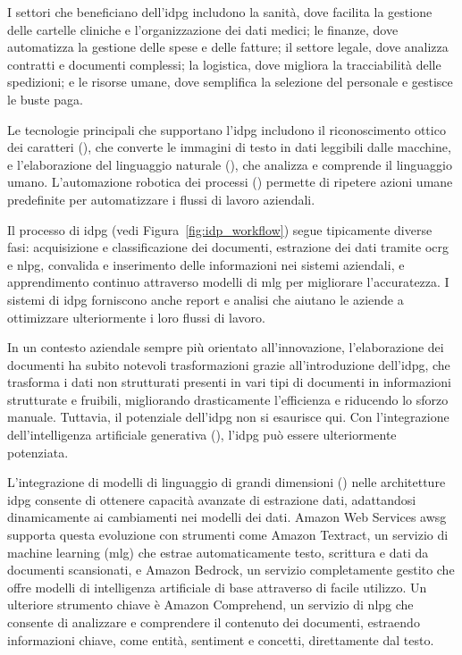 I settori che beneficiano dell'\gls{idpg} includono la sanità, dove facilita la gestione delle cartelle cliniche e l'organizzazione dei dati medici; le finanze, dove automatizza la gestione delle spese e delle fatture; il settore legale, dove analizza contratti e documenti complessi; la logistica, dove migliora la tracciabilità delle spedizioni; e le risorse umane, dove semplifica la selezione del personale e gestisce le buste paga.

Le tecnologie principali che supportano l'\gls{idpg} includono il riconoscimento ottico dei caratteri (), che converte le immagini di testo in dati leggibili dalle macchine, e l'elaborazione del linguaggio naturale (), che analizza e comprende il linguaggio umano. L'automazione robotica dei processi () permette di ripetere azioni umane predefinite per automatizzare i flussi di lavoro aziendali.

Il processo di \gls{idpg} (vedi Figura~\ref{fig:idp_workflow}) segue tipicamente diverse fasi: acquisizione e classificazione dei documenti, estrazione dei dati tramite \gls{ocrg} e \gls{nlpg}, convalida e inserimento delle informazioni nei sistemi aziendali, e apprendimento continuo attraverso modelli di \gls{mlg} per migliorare l'accuratezza. I sistemi di \gls{idpg} forniscono anche report e analisi che aiutano le aziende a ottimizzare ulteriormente i loro flussi di lavoro.

In un contesto aziendale sempre più orientato all'innovazione, l'elaborazione dei documenti ha subito notevoli trasformazioni grazie all'introduzione dell'\gls{idpg}, che trasforma i dati non strutturati presenti in vari tipi di documenti in informazioni strutturate e fruibili, migliorando drasticamente l'efficienza e riducendo lo sforzo manuale. Tuttavia, il potenziale dell'\gls{idpg} non si esaurisce qui. Con l'integrazione dell'intelligenza artificiale generativa (), l'\gls{idpg} può essere ulteriormente potenziata.

L'integrazione di modelli di linguaggio di grandi dimensioni () nelle architetture \gls{idpg} consente di ottenere capacità avanzate di estrazione dati, adattandosi dinamicamente ai cambiamenti nei modelli dei dati. Amazon Web Services \gls{awsg} supporta questa evoluzione con strumenti come Amazon Textract, un servizio di machine learning (\gls{mlg}) che estrae automaticamente testo, scrittura e dati da documenti scansionati, e Amazon Bedrock, un servizio completamente gestito che offre modelli di intelligenza artificiale di base attraverso  di facile utilizzo. Un ulteriore strumento chiave è Amazon Comprehend, un servizio di \gls{nlpg} che consente di analizzare e comprendere il contenuto dei documenti, estraendo informazioni chiave, come entità, sentiment e concetti, direttamente dal testo.

